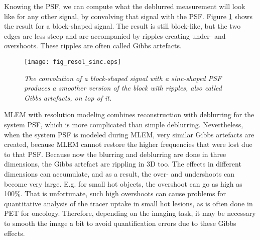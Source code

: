Knowing the PSF, we can compute what the deblurred measurement will
look like for any other signal, by convolving that signal with the
PSF. Figure \ref{fig:resolsinc} shows the result for a block-shaped
signal. The result is still block-like, but the two edges are less
steep and are accompanied by ripples creating under- and
overshoots. These ripples are often called Gibbs artefacts.

\begin{figure}[htb]
\centering
\texttt{[image: fig\_resol\_sinc.eps]}
\caption{\label{fig:resolsinc} \emph{The convolution of a block-shaped
    signal with a sinc-shaped PSF produces a smoother version of the
    block with ripples, also called Gibbs artefacts, on top of it.}}
\end{figure}

MLEM with resolution modeling combines reconstruction with deblurring
for the system PSF, which is more complicated than simple
deblurring. Nevertheless, when the system PSF is modeled during MLEM,
very similar Gibbs artefacts are created, because MLEM cannot restore
the higher frequencies that were lost due to that PSF. Because now the
blurring and deblurring are done in three dimensions, the Gibbs
artefact are rippling in 3D too. The effects in different dimensions
can accumulate, and as a result, the over- and undershoots can become
very large. E.g. for small hot objects, the overshoot can go as high
as 100\%. That is unfortunate, such high overshoots can cause problems
for quantitative analysis of the tracer uptake in small hot lesions,
as is often done in PET for oncology. Therefore, depending on the
imaging task, it may be necessary to smooth the image a bit to avoid
quantification errors due to these Gibbs effects.